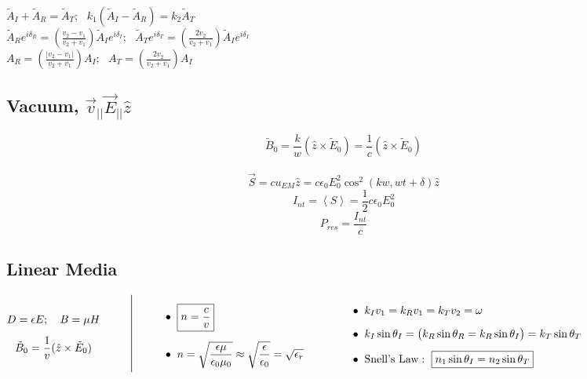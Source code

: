 \documentclass[12pt]{article}
\begin{document}
$\tilde A_I + \tilde A_R = \tilde A_T;\ \ \  k_1( \tilde A_I - \tilde A_R ) = k_2 \tilde A_T$ \\ 

$\displaystyle \tilde A_R e^{i\delta_R} = \left( \frac{v_2 - v_1}{v_2 + v_1} \right) \tilde A_I e^{i\delta_I}; \ \ \ 
	\tilde A_T e^{i\delta_T} = \left( \frac{2v_2}{v_2 + v_1} \right) \tilde A_I e^{i\delta_I}$ \\

$A_R = \left( \displaystyle \frac{|v_2 - v_1|}{v_2 + v_1} \right) A_I; \ \ \ A_T = \left( \displaystyle \frac{2v_2}{v_2 + v_1} \right)A_I$
\subsection{Vacuum, $\vec{v}_{||} \vec{E}_{||} \hat z$}
\[\tilde B_0 = \frac{k}{w}(\hat z \times \tilde E_0) = \frac{1}{c}(\hat z \times \tilde E_0) \] \\
\[ \vec{S} = cu_{EM} \hat z = c \epsilon_0 E_0^2 \cos^2(kw,wt+\delta) \hat z\]
\[ I_{nt} = \left< S \right> = \frac{1}{2} c \epsilon_0 E_0^2\]
\[ P_{res} = \frac{I_{nt}}{c}\]

\newpage
\subsection{Linear Media}

\vspace{10pt}
\(\begin{gathered}
	D = \epsilon E;\ \ \ B = \mu H \\[5pt]
	\tilde B_0 = \frac{1}{v}(\hat z \times \tilde E_0)
\end{gathered}
\hspace{1cm}
\rule[-30pt]{.5pt}{70pt}
\hspace{1cm}
\begin{aligned}
	&\bullet \ \boxed{ n = \frac{c}{v} }\\[5pt]
	&\bullet \ n = \sqrt{ \frac{ \epsilon \mu }{ \epsilon_0 \mu_0 } } 
		\approx \sqrt{ \frac{\epsilon}{\epsilon_0} } 
		= \sqrt{ \epsilon_r }
\end{aligned}
\hspace{1.5cm}
\begin{aligned}
	&\bullet\ k_I v_1 = k_R v_1 = k_T v_2 = \omega \\[5pt]
	&\bullet\ k_I \sin{\theta_I} = \big( k_R \sin{\theta_R} = k_R \sin{\theta_I} \big) = k_T \sin{\theta_T}\\[5pt]
	&\bullet\ \text{Snell's Law}:\ \boxed{ n_1 \sin \theta_I = n_2 \sin \theta_T }
\end{aligned}\)
\end{document}
